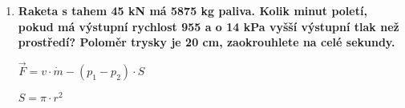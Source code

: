 \documentclass[../main.tex]{subfiles}
\begin{document}
\begin{enumerate}[label={\textbf{\arabic*.}}, resume]
\begin{minipage}{0.7\textwidth}
    \end{minipage}
    \hfill
    \begin{minipage}{0.25\textwidth}
    \end{minipage}
    \item \textbf{Raketa s tahem 45 kN má 5875 kg paliva. Kolik minut poletí, pokud má výstupní rychlost 955 \ms a o 14 kPa vyšší výstupní tlak než prostředí? Poloměr trysky je 20 cm, zaokrouhlete na celé sekundy.}
    \vspace{-0.25cm}
    \begin{flushright}
        \begin{minipage}{0.29\textwidth}
            \begin{tcolorbox}[colframe=black, colback=white, boxrule=0.6pt]
                {$\vec{F}=v\cdot{\dot{m}-(p_1-p_2)\cdot{S}}$}
            \end{tcolorbox}
        \end{minipage}
        \begin{minipage}{0.14\textwidth}
            \begin{tcolorbox}[colframe=black, colback=white, boxrule=0.6pt]
                {$S=\pi\cdot{r^2}$}
            \end{tcolorbox}
        \end{minipage}
    \end{flushright}
    \vfill
\end{enumerate}
\end{document}
